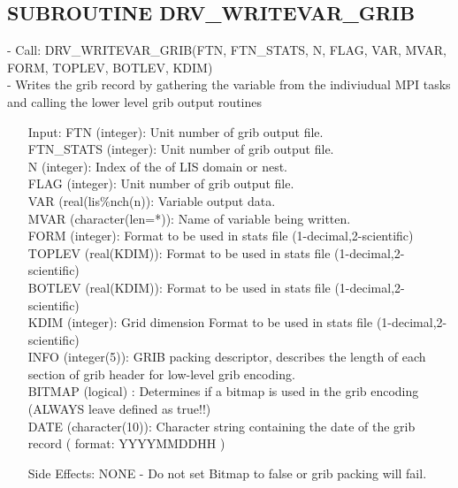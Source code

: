 \subsection{ SUBROUTINE DRV\_WRITEVAR\_GRIB }
- Call: DRV\_WRITEVAR\_GRIB(FTN, FTN\_STATS, N, FLAG, VAR, MVAR,
  FORM, TOPLEV, BOTLEV, KDIM)   \\
- Writes the grib record by gathering the variable from the indiviudual MPI
  tasks and calling the lower level grib output routines
\begin{itemize}
 \item[Input: ]
  FTN (integer): Unit number of grib output file. \\
  FTN\_STATS (integer): Unit number of grib output file. \\
  N (integer): Index of the of LIS domain or nest. \\
  FLAG (integer): Unit number of grib output file. \\
  VAR (real(lis\%nch(n)): Variable output data. \\
  MVAR (character(len=*)): Name of variable being written. \\
  FORM (integer): Format to be used in stats file (1-decimal,2-scientific) \\
  TOPLEV (real(KDIM)): Format to be used in stats file (1-decimal,2-scientific) \\
  BOTLEV (real(KDIM)): Format to be used in stats file (1-decimal,2-scientific) \\
  KDIM (integer): Grid dimension Format to be used in stats file (1-decimal,2-scientific) \\
  INFO (integer(5)): GRIB packing descriptor, describes the length of each
     section of grib header for low-level grib encoding. \\
  BITMAP (logical) : Determines if a bitmap is used in the grib encoding
     (ALWAYS leave defined as true!!) \\
  DATE (character(10)): Character string containing the date of the grib
     record ( format: YYYYMMDDHH )  \\
 \item[Side Effects:]
  NONE - Do not set Bitmap to false or grib packing will fail.
\end{itemize}

